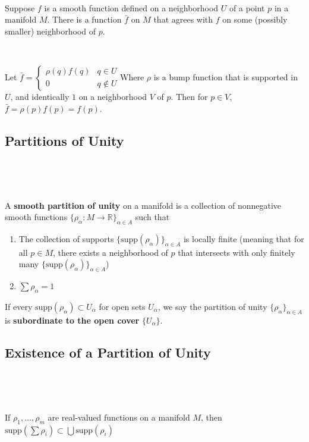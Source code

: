 \documentclass{article}
\begin{document}
\begin{proposition}
  \

  Suppose $f$ is a smooth function defined on a neighborhood $U$ of a point $p$ in a manifold $M$. There is a function $\bar{f}$ on $M$ that agrees with $f$ on some (possibly smaller) neighborhood of $p$.
\end{proposition}

\begin{customproof}
  \

  Let $\bar{f} =
  \begin{cases}
    \rho(q)f(q) & q \in U\\
    0 & q \notin U
  \end{cases}$Where $\rho$ is a bump function that is supported in $U$, and identically $1$ on a neighborhood $V$ of $p$. Then for $p \in V$, $\bar{f} = \rho(p)f(p) = f(p)$.
\end{customproof}

\subsection{Partitions of Unity}
\

\begin{definition}
  \

  A \textbf{smooth partition of unity} on a manifold is a collection of nonnegative smooth functions $\{\rho_\alpha: M \to \mathbb{R}\}_{\alpha \in A}$ such that
  \begin{enumerate}
    \item The collection of supports $\{\text{supp} (\rho_\alpha)\}_{\alpha \in A}$ is locally finite (meaning that for all $p \in M$, there exists a neighborhood of $p$ that intersects with only finitely many $\{\text{supp} (\rho_\alpha)\}_{\alpha \in A}$)
    \item $\sum \rho_\alpha = 1$
  \end{enumerate}If every $\text{supp}(\rho_\alpha) \subset U_\alpha$ for open sets $U_\alpha$, we say the partition of unity $\{\rho_\alpha\}_{\alpha \in A}$ is \textbf{subordinate to the open cover} $\{U_\alpha\}$.
\end{definition}

\subsection{Existence of a Partition of Unity}
\

\begin{lemma}
  \

  If $\rho_1, \dots, \rho_m$ are real-valued functions on a manifold $M$, then $\text{supp}(\sum \rho_i) \subset \bigcup \text{supp}( \rho_i)$
\end{lemma}
\end{document}
